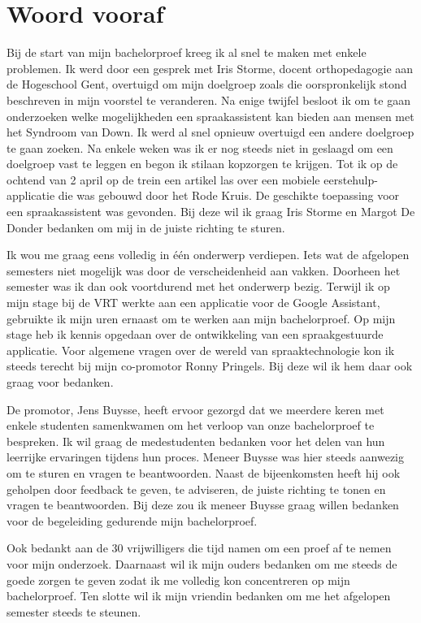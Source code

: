 
\chapter*{Woord vooraf}
\label{ch:voorwoord}

Bij de start van mijn bachelorproef kreeg ik al snel te maken met enkele problemen. Ik werd door een gesprek met Iris Storme, docent orthopedagogie aan de Hogeschool Gent, overtuigd om mijn doelgroep zoals die oorspronkelijk stond beschreven in mijn voorstel te veranderen. Na enige twijfel besloot ik om te gaan onderzoeken welke mogelijkheden een spraakassistent kan bieden aan mensen met het Syndroom van Down. Ik werd al snel opnieuw overtuigd een andere doelgroep te gaan zoeken. Na enkele weken was ik er nog steeds niet in geslaagd om een doelgroep vast te leggen en begon ik stilaan kopzorgen te krijgen. Tot ik op de ochtend van 2 april op de trein een artikel las over een mobiele eerstehulp-applicatie die was gebouwd door het Rode Kruis. De geschikte toepassing voor een spraakassistent was gevonden. Bij deze wil ik graag Iris Storme en Margot De Donder bedanken om mij in de juiste richting te sturen.

Ik wou me graag eens volledig in één onderwerp verdiepen. Iets wat de afgelopen semesters niet mogelijk was door de verscheidenheid aan vakken. Doorheen het semester was ik dan ook voortdurend met het onderwerp bezig. Terwijl ik op mijn stage bij de VRT werkte aan een applicatie voor de Google Assistant, gebruikte ik mijn uren ernaast om te werken aan mijn bachelorproef. Op mijn stage heb ik kennis opgedaan over de ontwikkeling van een spraakgestuurde applicatie. Voor algemene vragen over de wereld van spraaktechnologie kon ik steeds terecht bij mijn co-promotor Ronny Pringels. Bij deze wil ik hem daar ook graag voor bedanken.

De promotor, Jens Buysse, heeft ervoor gezorgd dat we meerdere keren met enkele studenten samenkwamen om het verloop van onze bachelorproef te bespreken. Ik wil graag de medestudenten bedanken voor het delen van hun leerrijke ervaringen tijdens hun proces. Meneer Buysse was hier steeds aanwezig om te sturen en vragen te beantwoorden. Naast de bijeenkomsten heeft hij ook geholpen door feedback te geven, te adviseren, de juiste richting te tonen en vragen te beantwoorden. Bij deze zou ik meneer Buysse graag willen bedanken voor de begeleiding gedurende mijn bachelorproef.

Ook bedankt aan de 30 vrijwilligers die tijd namen om een proef af te nemen voor mijn onderzoek. Daarnaast wil ik mijn ouders bedanken om me steeds de goede zorgen te geven zodat ik me volledig kon concentreren op mijn bachelorproef. Ten slotte wil ik mijn vriendin bedanken om me het afgelopen semester steeds te steunen.